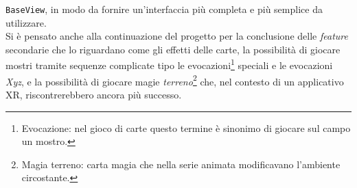 \texttt{BaseView}, in modo da fornire un'interfaccia più completa e più semplice da utilizzare.\\
Si è pensato anche alla continuazione del progetto per la conclusione delle \textit{feature} secondarie che lo riguardano come gli effetti delle carte, la possibilità di giocare
mostri tramite sequenze complicate tipo le evocazioni\footnote{Evocazione: nel gioco di carte questo termine è sinonimo di giocare sul campo un mostro.} speciali e le evocazioni 
\textit{Xyz}, e la possibilità di giocare magie \textit{terreno}\footnote{Magia terreno: carta magia che nella serie animata modificavano l'ambiente circostante.} che, nel contesto di
un applicativo XR, riscontrerebbero ancora più successo.\\